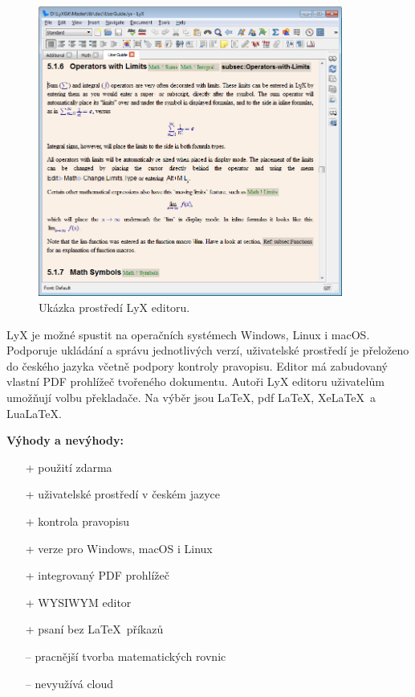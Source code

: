 \begin{figure}[h]
	\centering
	\includegraphics[width=10cm]{obrazky/lyx.png}
	\caption[Ukázka prostředí LyX editoru.]{Ukázka prostředí LyX editoru. \cite{Lyximg}}
	\label{fig:lyx}
\end{figure}

LyX je možné spustit na operačních systémech Windows, Linux i macOS. Podporuje ukládání a správu jednotlivých verzí, uživatelské prostředí je přeloženo do českého jazyka včetně podpory kontroly pravopisu. Editor má zabudovaný vlastní PDF prohlížeč tvořeného dokumentu. Autoři LyX editoru uživatelům umožňují volbu překladače. Na výběr jsou \LaTeX, pdf \LaTeX, Xe\LaTeX\ a Lua\LaTeX. \cite{Lyxfeatures}

\textbf{Výhody a nevýhody:}
\begin{multicols}{2}
	\begin{itemize}
		\item [+] použití zdarma
		\item [+] uživatelské prostředí v českém jazyce
		\item [+] kontrola pravopisu
		\item [+] verze pro Windows, macOS i Linux
		\item [+] integrovaný PDF prohlížeč
		\item [+] WYSIWYM editor
		\item [+] psaní bez \LaTeX\ příkazů
	\columnbreak
		\item [--] pracnější tvorba matematických rovnic
		\item [--] nevyužívá cloud
	\end{itemize}
\end{multicols}


